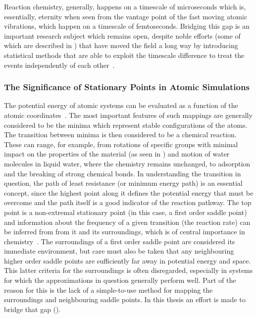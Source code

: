Reaction chemistry, generally, happens on a timescale of microseconds which is, essentially, eternity when seen from the vantage point of the fast moving atomic vibrations, which happen on a timescale of femtoseconds.
Bridging this gap is an important research subject which remains open, despite noble efforts (some of which are described in ) that have moved the field a long way by introducing statistical methods that are able to exploit the timescale difference to treat the events independently of each other~\cite{tst-eyring-1935, tst-polanyi-1935, tst-wigner-1938, htst-wert-1949, htst-vineyard-1957, tst-1990}.

\subsubsection{The Significance of Stationary Points in Atomic Simulations}
The potential energy of atomic systems can be evaluated as a function of the atomic coordinates~\cite{born-oppenheimer-1927, schrodinger-equation-1926, kohn-1999}.
The most important features of such mappings are generally considered to be the minima which represent stable configurations of the atoms.
The transition between minima is then considered to be a chemical reaction.
These can range, for example, from rotations of specific groups with minimal impact on the properties of the material (as seen in ) and motion of water molecules in liquid water, where the chemistry remains unchanged, to adsorption and the breaking of strong chemical bonds.
In understanding the transition in question, the path of least resistance (or minimum energy path) is an essential concept, since the highest point along it defines the potential energy that must be overcome and the path itself is a good indicator of the reaction pathway.
The top point is a non-extremal stationary point (in this case, a first order saddle point) and information about the frequency of a given transition (the reaction rate) can be inferred from from it and its surroundings, which is of central importance in chemistry~\cite{htst-wert-1949, htst-vineyard-1957}.
The surroundings of a first order saddle point are considered its immediate environment, but care must also be taken that any neighbouring higher order saddle points are sufficiently far away in potential energy and space.
This latter criteria for the surroundings is often disregarded, especially in systems for which the approximations in question generally perform well.
Part of the reason for this is the lack of a simple-to-use method for mapping the surroundings and neighbouring saddle points.
In this thesis an effort is made to bridge that gap ().

